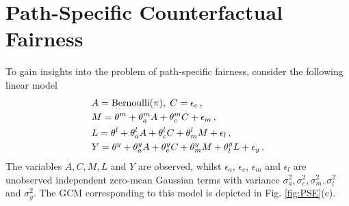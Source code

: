 \documentclass{article}
\newcommand{\figref}[1]{Fig. \ref{#1}}
\begin{document}
\section{Path-Specific Counterfactual Fairness\label{sec:ArtificiaDataExample}}
To gain insights into the problem of path-specific fairness, consider the following linear model
\begin{align}
&A=\textrm{Bernoulli}(\pi), \hskip0.1cm C = \epsilon_c\,,\nonumber\\
&M=\theta^m+\theta^m_{a}A+\theta^m_{c}C+\epsilon_m\,,\nonumber\\
&L=\theta^l+\theta^l_{a}A+\theta^l_{c}C+\theta^l_{m}M+\epsilon_l\,,\nonumber\\
&Y=\theta^y+\theta^y_{a}A+\theta^y_{c}C+\theta^y_{m}M+\theta^y_{l}L+\epsilon_y\,.
\label{eq:lm}
\end{align}
The variables $A, C, M, L$ and $Y$ are observed, whilst $\epsilon_a$, $\epsilon_c$, $\epsilon_m$ and $\epsilon_l$ are unobserved independent zero-mean Gaussian terms with variance $\sigma^2_a,\sigma^2_c,\sigma^2_m,\sigma^2_l$ and $\sigma^2_y$.
The GCM corresponding to this model is depicted in \figref{fig:PSE}(c).
\end{document}
